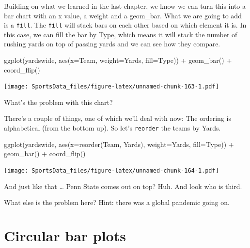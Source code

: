 \documentclass[
]{book}
\newenvironment{Shaded}{\begin{snugshade}}{\end{snugshade}}
\newcommand{\AttributeTok}[1]{\textcolor[rgb]{0.77,0.63,0.00}{#1}}
\newcommand{\FunctionTok}[1]{\textcolor[rgb]{0.00,0.00,0.00}{#1}}
\newcommand{\NormalTok}[1]{#1}
\newcommand{\SpecialCharTok}[1]{\textcolor[rgb]{0.00,0.00,0.00}{#1}}
\begin{document}
Building on what we learned in the last chapter, we know we can turn this into a bar chart with an x value, a weight and a geom\_bar. What we are going to add is a \texttt{fill}. The \texttt{fill} will stack bars on each other based on which element it is. In this case, we can fill the bar by Type, which means it will stack the number of rushing yards on top of passing yards and we can see how they compare.

\begin{Shaded}
\begin{Highlighting}[]
\FunctionTok{ggplot}\NormalTok{(yardswide, }\FunctionTok{aes}\NormalTok{(}\AttributeTok{x=}\NormalTok{Team, }\AttributeTok{weight=}\NormalTok{Yards, }\AttributeTok{fill=}\NormalTok{Type)) }\SpecialCharTok{+} 
  \FunctionTok{geom\_bar}\NormalTok{() }\SpecialCharTok{+} 
  \FunctionTok{coord\_flip}\NormalTok{()}
\end{Highlighting}
\end{Shaded}

\texttt{[image: SportsData\_files/figure-latex/unnamed-chunk-163-1.pdf]}

What's the problem with this chart?

There's a couple of things, one of which we'll deal with now: The ordering is alphabetical (from the bottom up). So let's \texttt{reorder} the teams by Yards.

\begin{Shaded}
\begin{Highlighting}[]
\FunctionTok{ggplot}\NormalTok{(yardswide, }\FunctionTok{aes}\NormalTok{(}\AttributeTok{x=}\FunctionTok{reorder}\NormalTok{(Team, Yards), }\AttributeTok{weight=}\NormalTok{Yards, }\AttributeTok{fill=}\NormalTok{Type)) }\SpecialCharTok{+} 
  \FunctionTok{geom\_bar}\NormalTok{() }\SpecialCharTok{+} 
  \FunctionTok{coord\_flip}\NormalTok{()}
\end{Highlighting}
\end{Shaded}

\texttt{[image: SportsData\_files/figure-latex/unnamed-chunk-164-1.pdf]}

And just like that \ldots{} Penn State comes out on top? Huh. And look who is third.

What else is the problem here? Hint: there was a global pandemic going on.

\hypertarget{circular-bar-plots}{%
\chapter{Circular bar plots}\label{circular-bar-plots}}
\end{document}

